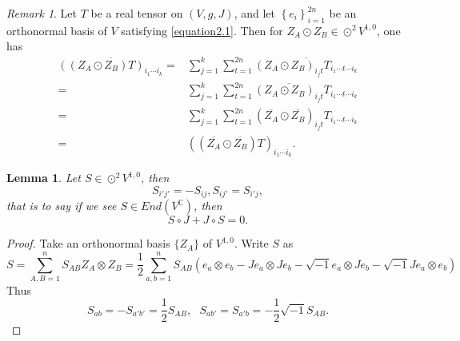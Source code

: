 \documentclass{amsart}
\newtheorem{lemma}[theorem]{Lemma}
\theoremstyle{definition}
\theoremstyle{remark}
\newtheorem{remark}[theorem]{Remark}
\numberwithin{equation}{section}
\begin{document}
\begin{remark}
\label{remark2.2}
Let $T$  be a real tensor on $\left( V,g,J \right)$, and let $\left\{ {{e_i}} \right\}_{i = 1}^{2n}$ be an orthonormal basis of  $V$ satisfying \eqref{equation2.1}. Then for ${Z_A} \odot {Z_B} \in { \odot ^2}{V^{1,0}}$, one has
\begin{align*}
\overline {{{\left( {\left( {{Z_A} \odot {Z_B}} \right)T} \right)}_{{i_1} \cdots {i_k}}}}  =& \sum\limits_{j = 1}^k {\sum\limits_{t = 1}^{2n} {\overline {{{\left( {{Z_A} \odot {Z_B}} \right)}_{{i_j}t}}{T_{{i_1} \cdots t \cdots {i_k}}}} } } \\
 =& \sum\limits_{j = 1}^k {\sum\limits_{t = 1}^{2n} {\overline {{{\left( {{Z_A} \odot {Z_B}} \right)}_{{i_j}t}}} {T_{{i_1} \cdots t \cdots {i_k}}}} } \\
 =& \sum\limits_{j = 1}^k {\sum\limits_{t = 1}^{2n} {{{\left( {\overline {{Z_A}}  \odot \overline {{Z_B}} } \right)}_{{i_j}t}}{T_{{i_1} \cdots t \cdots {i_k}}}} } \\
 =& {\left( {\left( {\overline {{Z_A}}  \odot \overline {{Z_B}} } \right)T} \right)_{{i_1} \cdots {i_k}}}.
\end{align*}
\end{remark}


\begin{lemma}
\label{lemma2.3}
Let $S \in {\odot} ^2 V^{1,0}$, then
$$S_{i'j'} =  - S_{ij} ,S_{ij'} = S_{i'j} ,$$
that is to say if we see $S \in End\left( V^ {\mathbb{C}} \right)$, then
$$S \circ J + J \circ S = 0.$$
\end{lemma}
\begin{proof}
Take an orthonormal basis $\{Z_A\}$ of $V^{1,0}$.  Write $S$ as
$$S = \sum\limits_{A,B = 1}^n {{S_{AB}}{Z_A} \otimes {Z_B}}  = \frac{1}{2}\sum\limits_{a,b = 1}^n {{S_{AB}}\left( {{e_a} \otimes {e_b} - J{e_a} \otimes J{e_b} - \sqrt { - 1} {e_a} \otimes J{e_b} - \sqrt { - 1} J{e_a} \otimes {e_b}} \right)} $$
Thus
$$S_{ab}  =  - S_{a'b'} = \frac12S_{AB},\ \ \ S_{ab'}  = S_{a'b} = - \frac12\sqrt { - 1} S_{AB}.$$
\end{proof}
\end{document}

